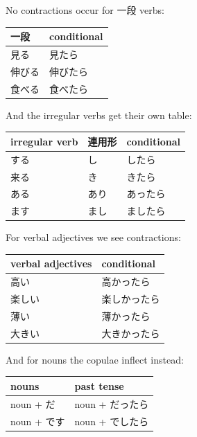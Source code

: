 \documentclass[11pt, b5paper, twoside, openright, onecolumn]{book}
\newenvironment{mytabular}[1]{\noindent\hspace{0.4in}
\begin{tabular}[h]{#1}}{\end{tabular}}
\begin{document}
No contractions occur for 一段 verbs:

\vspace{0.5cm}
\smaller
\begin{mytabular}{| l  l |}\hline 
\rule{0pt}{2.4ex}一段 & conditional\\ 
\hline
\rule{0pt}{2.4ex}見る & 見たら\\ 
\rule{0pt}{2.4ex}伸びる & 伸びたら\\ 
\rule{0pt}{2.4ex}食べる & 食べたら\\ 
\hline 
\end{mytabular}
\larger
\vspace{0.5cm}


And the irregular verbs get their own table:

\vspace{0.5cm}
\smaller
\begin{mytabular}{| l  l  l |}\hline 
\rule{0pt}{2.4ex}irregular verb & 連用形 & conditional\\ 
\hline
\rule{0pt}{2.4ex}する & し & したら\\ 
\rule{0pt}{2.4ex}来る & き & きたら\\ 
\rule{0pt}{2.4ex}ある & あり & あったら\\ 
\rule{0pt}{2.4ex}ます & まし & ましたら\\ 
\hline 
\end{mytabular}
\larger
\vspace{0.5cm}


For verbal adjectives we see contractions:

\vspace{0.5cm}
\smaller
\begin{mytabular}{| l  l |}\hline 
\rule{0pt}{2.4ex}verbal adjectives & conditional\\ 
\hline
\rule{0pt}{2.4ex}高い & 高かったら\\ 
\rule{0pt}{2.4ex}楽しい & 楽しかったら\\ 
\rule{0pt}{2.4ex}薄い & 薄かったら\\ 
\rule{0pt}{2.4ex}大きい & 大きかったら\\ 
\hline 
\end{mytabular}
\larger
\vspace{0.5cm}


And for nouns the copulae inflect instead:

\vspace{0.5cm}
\smaller
\begin{mytabular}{| l  l |}\hline 
\rule{0pt}{2.4ex}nouns & past tense\\ 
\hline
\rule{0pt}{2.4ex}noun + だ & noun + だったら\\ 
\rule{0pt}{2.4ex}noun + です & noun + でしたら\\ 
\hline 
\end{mytabular}
\larger
\vspace{0.5cm}
\end{document}
